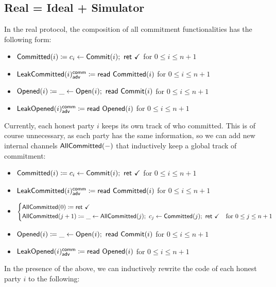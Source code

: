 \subsection{Real = Ideal + Simulator}
In the real protocol, the composition of all commitment functionalities has the following form:

\begin{itemize}
\item {\color{magenta} $\mathsf{Committed}(i) \coloneqq c_i \leftarrow \mathsf{Commit}(i); \ \mathsf{ret} \ \checkmark$ for $0 \leq i \leq n+1$}
\item {\color{magenta} $\mathsf{LeakCommitted}(i)^{\mathsf{comm}}_{\mathsf{adv}} \coloneqq \mathsf{read} \ \mathsf{Committed}(i)$ for $0 \leq i \leq n+1$}
\item {\color{red} $\mathsf{Opened}(i) \coloneqq \_ \leftarrow \mathsf{Open}(i); \ \mathsf{read} \ \mathsf{Commit}(i)$ for $0 \leq i \leq n+1$}
\item {\color{red} $\mathsf{LeakOpened}(i)^{\mathsf{comm}}_{\mathsf{adv}} \coloneqq \mathsf{read} \ \mathsf{Opened}(i)$ for $0 \leq i \leq n+1$}
\end{itemize}

\noindent Currently, each honest party $i$ keeps its own track of who committed. This is of course unnecessary, as each party has the same information, so we can add new internal channels $\mathsf{AllCommitted}(-)$ that inductively keep a global track of commitment:

\begin{itemize}
\item {\color{magenta} $\mathsf{Committed}(i) \coloneqq c_i \leftarrow \mathsf{Commit}(i); \ \mathsf{ret} \ \checkmark$ for $0 \leq i \leq n+1$}
\item {\color{magenta} $\mathsf{LeakCommitted}(i)^{\mathsf{comm}}_{\mathsf{adv}} \coloneqq \mathsf{read} \ \mathsf{Committed}(i)$ for $0 \leq i \leq n+1$}
\item {\color{magenta} $\begin{cases*} \AllCommitted(0) \coloneqq \ret{\checkmark} & \\ \AllCommitted(j+1) \coloneqq \_ \leftarrow \AllCommitted(j); \ c_j \leftarrow \Committed(j); \ \ret{\checkmark} & \text{for $0 \leq j \leq n+1$} \end{cases*}$}
\item {\color{red} $\mathsf{Opened}(i) \coloneqq \_ \leftarrow \mathsf{Open}(i); \ \mathsf{read} \ \mathsf{Commit}(i)$ for $0 \leq i \leq n+1$}
\item {\color{red} $\mathsf{LeakOpened}(i)^{\mathsf{comm}}_{\mathsf{adv}} \coloneqq \mathsf{read} \ \mathsf{Opened}(i)$ for $0 \leq i \leq n+1$}
\end{itemize}

\noindent In the presence of the above, we can inductively rewrite the code of each honest party $i$ to the following:

